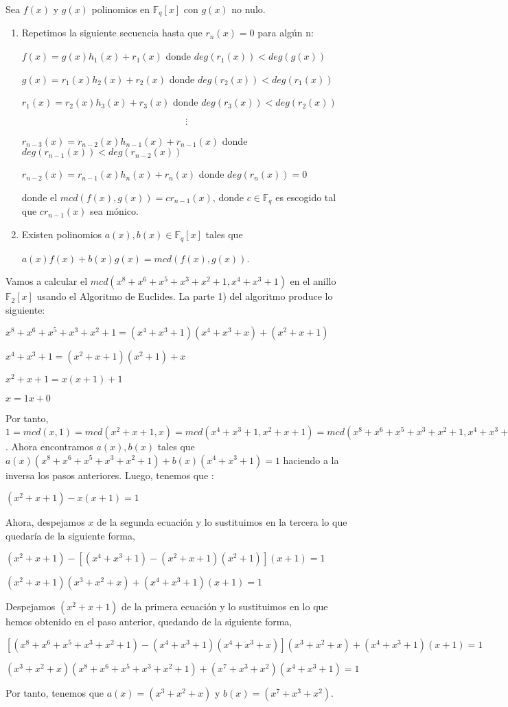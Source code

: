 \begin{theorem}
Sea $f(x)$ y $g(x)$ polinomios en $\mathbb{F}_q[x]$ con $g(x)$ no nulo.
\begin{enumerate}
	\item Repetimos la siguiente secuencia hasta que $r_n(x) = 0$ para algún n:
	
	$f(x) = g(x)h_1(x) + r_1(x)$ donde $deg(r_1(x)) < deg(g(x))$
	
	$g(x) = r_1(x)h_2(x) + r_2(x)$ donde $deg(r_2(x)) < deg(r_1(x))$
	
	$r_1(x) = r_2(x)h_3(x) + r_3(x)$ donde $deg(r_3(x)) < deg(r_2(x))$
	
	\[ \vdots \]
	
	$r_{n-3}(x) = r_{n-2}(x)h_{n-1}(x) + r_{n-1}(x)$ donde $deg(r_{n-1}(x)) < deg(r_{n-2}(x))$
	
	$r_{n-2}(x) = r_{n-1}(x)h_{n}(x) + r_{n}(x)$ donde $deg(r_{n}(x)) = 0$
	
	donde el $mcd(f(x),g(x)) = cr_{n-1}(x)$, donde $c \in \mathbb{F}_q$ es escogido tal que $cr_{n-1}(x)$ sea mónico.
	\item Existen polinomios $a(x),b(x) \in \mathbb{F}_q[x]$ tales que 
	
	$a(x)f(x) + b(x)g(x) = mcd(f(x),g(x))$.
		
\end{enumerate}
\end{theorem}

\begin{exampleth}
Vamos a calcular el $mcd(x^8+x^6+x^5+x^3+x^2+1,x^4+x^3+1)$ en el anillo $\mathbb{F}_2[x]$ usando el Algoritmo de Euclides. La parte 1) del algoritmo produce lo siguiente:

	$x^8+x^6+x^5+x^3+x^2+1 = (x^4+x^3+1)(x^4+x^3+x) + (x^2+x+1)$
	
	$x^4+x^3+1 = (x^2+x+1)(x^2+1) + x $
	
	$x^2+x+1 = x(x+1) + 1$
	
	$x = 1x + 0$
	
Por tanto, $ 1 = mcd(x,1) = mcd(x^2+x+1,x) = mcd(x^4+x^3+1,x^2+x+1) = mcd(x^8+x^6+x^5+x^3+x^2+1,x^4+x^3+1)$. Ahora encontramos $a(x),b(x)$ tales que $a(x)(x^8+x^6+x^5+x^3+x^2+1) + b(x)(x^4+x^3+1) = 1$ haciendo a la inversa los pasos anteriores. Luego, tenemos que :

$ (x^2+x+1) - x(x+1) = 1$

Ahora, despejamos $x$ de la segunda ecuación y lo sustituimos en la tercera lo que quedaría de la siguiente forma,

$ (x^2+x+1) - [(x^4+x^3+1) - (x^2+x+1)(x^2+1)](x+1) = 1$

$(x^2+x+1)(x^3+x^2+x) + (x^4+x^3+1)(x+1) = 1$

Despejamos $(x^2+x+1)$ de la primera ecuación y lo sustituimos en lo que hemos obtenido en el paso anterior, quedando de la siguiente forma,

$[(x^8+x^6+x^5+x^3+x^2+1) - (x^4+x^3+1)(x^4+x^3+x)](x^3+x^2+x) + (x^4+x^3+1)(x+1) = 1 $

$(x^3+x^2+x)(x^8+x^6+x^5+x^3+x^2+1) + (x^7+x^3+x^2)(x^4+x^3+1) = 1$

Por tanto, tenemos que $a(x) = (x^3+x^2+x)$ y $b(x) = (x^7+x^3+x^2)$.
\end{exampleth}

